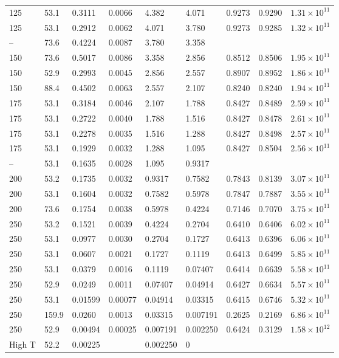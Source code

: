 \begin{small}
\begin{supertabular}{p{1.1cm}p{1.1cm}p{1.2cm}p{1.5cm}p{1.3cm}p{1.3cm}p{1.3cm}p{1.3cm}p{1.5cm}}
125 & 53.1 & 0.3111 & 0.0066 & 4.382 & 4.071 & 0.9273 & 0.9290 & \(1.31\!\times\!10^{11}\) \\
125 & 53.1 & 0.2912 & 0.0062 & 4.071 & 3.780 & 0.9273 & 0.9285 & \(1.32\!\times\!10^{11}\) \\
-- & 73.6 & 0.4224 & 0.0087 & 3.780 & 3.358 &  &  &  \\
150 & 73.6 & 0.5017 & 0.0086 & 3.358 & 2.856 & 0.8512 & 0.8506 & \(1.95\!\times\!10^{11}\) \\
150 & 52.9 & 0.2993 & 0.0045 & 2.856 & 2.557 & 0.8907 & 0.8952 & \(1.86\!\times\!10^{11}\) \\
150 & 88.4 & 0.4502 & 0.0063 & 2.557 & 2.107 & 0.8240 & 0.8240 & \(1.94\!\times\!10^{11}\) \\
175 & 53.1 & 0.3184 & 0.0046 & 2.107 & 1.788 & 0.8427 & 0.8489 & \(2.59\!\times\!10^{11}\) \\
175 & 53.1 & 0.2722 & 0.0040 & 1.788 & 1.516 & 0.8427 & 0.8478 & \(2.61\!\times\!10^{11}\) \\
175 & 53.1 & 0.2278 & 0.0035 & 1.516 & 1.288 & 0.8427 & 0.8498 & \(2.57\!\times\!10^{11}\) \\
175 & 53.1 & 0.1929 & 0.0032 & 1.288 & 1.095 & 0.8427 & 0.8504 & \(2.56\!\times\!10^{11}\) \\
-- & 53.1 & 0.1635 & 0.0028 & 1.095 & 0.9317 &  &  &  \\
200 & 53.2 & 0.1735 & 0.0032 & 0.9317 & 0.7582 & 0.7843 & 0.8139 & \(3.07\!\times\!10^{11}\) \\
200 & 53.1 & 0.1604 & 0.0032 & 0.7582 & 0.5978 & 0.7847 & 0.7887 & \(3.55\!\times\!10^{11}\) \\
200 & 73.6 & 0.1754 & 0.0038 & 0.5978 & 0.4224 & 0.7146 & 0.7070 & \(3.75\!\times\!10^{11}\) \\
250 & 53.2 & 0.1521 & 0.0039 & 0.4224 & 0.2704 & 0.6410 & 0.6406 & \(6.02\!\times\!10^{11}\) \\
250 & 53.1 & 0.0977 & 0.0030 & 0.2704 & 0.1727 & 0.6413 & 0.6396 & \(6.06\!\times\!10^{11}\) \\
250 & 53.1 & 0.0607 & 0.0021 & 0.1727 & 0.1119 & 0.6413 & 0.6499 & \(5.85\!\times\!10^{11}\) \\
250 & 53.1 & 0.0379 & 0.0016 & 0.1119 & 0.07407 & 0.6414 & 0.6639 & \(5.58\!\times\!10^{11}\) \\
250 & 52.9 & 0.0249 & 0.0011 & 0.07407 & 0.04914 & 0.6427 & 0.6634 & \(5.57\!\times\!10^{11}\) \\
250 & 53.1 & 0.01599 & 0.00077 & 0.04914 & 0.03315 & 0.6415 & 0.6746 & \(5.32\!\times\!10^{11}\) \\
250 & 159.9 & 0.0260 & 0.0013 & 0.03315 & 0.007191 & 0.2625 & 0.2169 & \(6.86\!\times\!10^{11}\) \\
250 & 52.9 & 0.00494 & 0.00025 & 0.007191 & 0.002250 & 0.6424 & 0.3129 & \(1.58\!\times\!10^{12}\) \\
High T & 52.2 & 0.00225 &  & 0.002250 & 0 &  &  &  \\
\end{supertabular}
\end{small}

